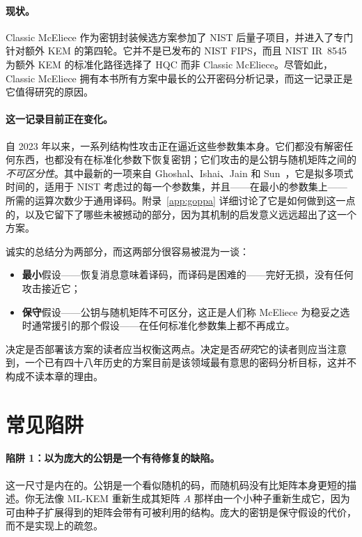 \paragraph{现状。}
Classic McEliece 作为密钥封装候选方案参加了 NIST 后量子项目，并进入了专门针对额外 KEM 的第四轮。它并不是已发布的 NIST FIPS，而且 NIST IR~8545 为额外 KEM 的标准化路径选择了 HQC 而非 Classic McEliece。尽管如此，Classic McEliece 拥有本书所有方案中最长的公开密码分析记录，而这一记录正是它值得研究的原因。

\paragraph{这一记录目前正在变化。}
自 2023 年以来，一系列结构性攻击正在逼近这些参数集本身。它们都没有解密任何东西，也都没有在标准化参数下恢复密钥；它们攻击的是公钥与随机矩阵之间的\emph{不可区分性}。其中最新的一项来自 Ghoshal、Ishai、Jain 和 Sun~\cite{gijs2026}，它是拟多项式时间的，适用于 NIST 考虑过的每一个参数集，并且——在最小的参数集上——所需的运算次数少于通用译码。附录~\ref{app:goppa} 详细讨论了它是如何做到这一点的，以及它留下了哪些未被撼动的部分，因为其机制的启发意义远远超出了这一个方案。

诚实的总结分为两部分，而这两部分很容易被混为一谈：

\begin{itemize}
  \item \textbf{最小}假设——恢复消息意味着译码，而译码是困难的——完好无损，没有任何攻击接近它；
  \item \textbf{保守}假设——公钥与随机矩阵不可区分，这正是人们称 McEliece 为稳妥之选时通常援引的那个假设——在任何标准化参数集上都不再成立。
\end{itemize}

决定是否部署该方案的读者应当权衡这两点。决定是否\emph{研究}它的读者则应当注意到，一个已有四十八年历史的方案目前是该领域最有意思的密码分析目标，这并不构成不读本章的理由。

\section{常见陷阱}

\paragraph{陷阱 1：以为庞大的公钥是一个有待修复的缺陷。}
这一尺寸是内在的。公钥是一个看似随机的码，而随机码没有比矩阵本身更短的描述。你无法像 ML-KEM 重新生成其矩阵 $A$ 那样由一个小种子重新生成它，因为可由种子扩展得到的矩阵会带有可被利用的结构。庞大的密钥是保守假设的代价，而不是实现上的疏忽。

